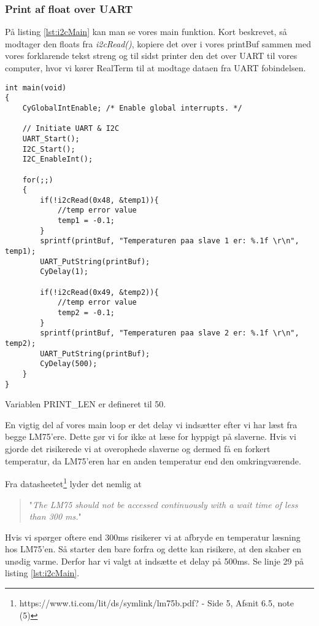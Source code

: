 \documentclass[../main.tex]{subfiles}
\begin{document}
\subsubsection{Print af float over UART}

På listing \ref{lst:i2cMain} kan man se vores main funktion. Kort beskrevet, så modtager den floats fra \textit{i2cRead()}, kopiere det over i vores printBuf sammen med vores forklarende tekst streng
 og til sidst printer den det over UART til vores computer, hvor vi kører RealTerm til at modtage dataen fra UART fobindelsen.

\begin{lstlisting}[caption={main()}, label=lst:i2cMain]
int main(void)
{
    CyGlobalIntEnable; /* Enable global interrupts. */
    
    // Initiate UART & I2C
    UART_Start();
    I2C_Start();
    I2C_EnableInt();
    
    for(;;)
    {
        if(!i2cRead(0x48, &temp1)){
            //temp error value
            temp1 = -0.1;
        }
        sprintf(printBuf, "Temperaturen paa slave 1 er: %.1f \r\n", temp1);
        UART_PutString(printBuf);
        CyDelay(1);
        
        if(!i2cRead(0x49, &temp2)){
            //temp error value
            temp2 = -0.1;
        }
        sprintf(printBuf, "Temperaturen paa slave 2 er: %.1f \r\n", temp2);
        UART_PutString(printBuf);
        CyDelay(500);
    }
}
\end{lstlisting}
Variablen PRINT\_LEN er defineret til 50.

En vigtig del af vores main loop er det delay vi indsætter efter vi har læst fra begge LM75'ere. Dette gør vi for ikke at læse for hyppigt på slaverne. 
Hvis vi gjorde det risikerede vi at overophede slaverne og dermed få en forkert temperatur, da LM75'eren har en anden temperatur end den omkringværende. 

Fra datasheetet\footnote{https://www.ti.com/lit/ds/symlink/lm75b.pdf? - Side 5, Afsnit 6.5, note (5)} lyder det nemlig at
\begin{quote}
    "\textit{The LM75 should not be accessed continuously with a
wait time of less than 300 ms.}"
\end{quote}
Hvis vi spørger oftere end 300ms risikerer vi at afbryde en temperatur læsning hos LM75'en. Så starter den bare forfra og dette kan risikere, at den skaber en unødig varme.
Derfor har vi valgt at indsætte et delay på 500ms. Se linje 29 på listing \ref{lst:i2cMain}.
\end{document}
